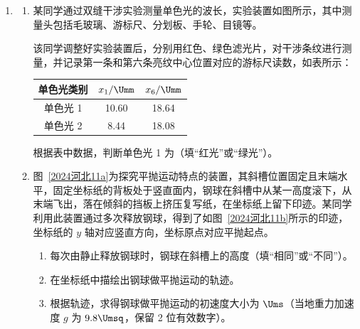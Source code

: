 \documentclass[\gkver]{gaokaozhenti}
\begin{document}
\begin{enumerate}

\item
\begin{enumerate}
	\item
	某同学通过双缝干涉实验测量单色光的波长，实验装置如图所示，其中测量头包括毛玻璃、游标尺、分划板、手轮、目镜等。

	该同学调整好实验装置后，分别用红色、绿色滤光片，对干涉条纹进行测量，并记录第一条和第六条亮纹中心位置对应的游标尺读数，如表所示：
	\begin{center}
	\begin{tabular}{|c|c|c|}
	\hline
	单色光类别 & $x_{1}/\Umm$ & $x_{6}/\Umm$ \\ \hline
	单色光 1 & 10.60 & 18.64 \\ \hline
	单色光 2 & 8.44 & 18.08 \\ \hline
	\end{tabular}
	\end{center}
	根据表中数据，判断单色光 1 为（填“红光”或“绿光”）。
	\item
	图~\ref{2024河北11a}为探究平抛运动特点的装置，其斜槽位置固定且末端水平，固定坐标纸的背板处于竖直面内，钢球在斜槽中从某一高度滚下，从末端飞出，落在倾斜的挡板上挤压复写纸，在坐标纸上留下印迹。某同学利用此装置通过多次释放钢球，得到了如图~\ref{2024河北11b}所示的印迹，坐标纸的 $y$ 轴对应竖直方向，坐标原点对应平抛起点。
	\begin{enumerate}
		\item
		每次由静止释放钢球时，钢球在斜槽上的高度（填“相同”或“不同”）。
		\item
		在坐标纸中描绘出钢球做平抛运动的轨迹。
		\item
		根据轨迹，求得钢球做平抛运动的初速度大小为 $\Ums$（当地重力加速度 $g$ 为 $9.8 \Umsq$，保留 2 位有效数字）。
	\end{enumerate}
\end{enumerate}


\end{enumerate}
\end{document}

